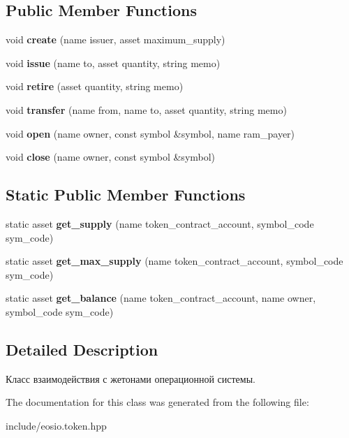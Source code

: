\subsection*{Public Member Functions}
\begin{DoxyCompactItemize}
\item 
\mbox{\label{classeosio_1_1token_a398d3ab0784aa52d314ff47666c51701}} 
void {\bfseries create} (name issuer, asset maximum\+\_\+supply)
\item 
\mbox{\label{classeosio_1_1token_a7dc16dac15ffa8313424676fc02c7015}} 
void {\bfseries issue} (name to, asset quantity, string memo)
\item 
\mbox{\label{classeosio_1_1token_a29c839dfaad1b3c46c2c3ababf232359}} 
void {\bfseries retire} (asset quantity, string memo)
\item 
\mbox{\label{classeosio_1_1token_a47e89b1fb0cf66946528bdebd9c786d9}} 
void {\bfseries transfer} (name from, name to, asset quantity, string memo)
\item 
\mbox{\label{classeosio_1_1token_a119743fdb70ea5f9dc1fea2c7774ed2d}} 
void {\bfseries open} (name owner, const symbol \&symbol, name ram\+\_\+payer)
\item 
\mbox{\label{classeosio_1_1token_a35f91e5e77635f0dfadc0eea93ec9da7}} 
void {\bfseries close} (name owner, const symbol \&symbol)
\end{DoxyCompactItemize}
\subsection*{Static Public Member Functions}
\begin{DoxyCompactItemize}
\item 
\mbox{\label{classeosio_1_1token_a1fb6c9a84871da4fb2f6023de5351dcf}} 
static asset {\bfseries get\+\_\+supply} (name token\+\_\+contract\+\_\+account, symbol\+\_\+code sym\+\_\+code)
\item 
\mbox{\label{classeosio_1_1token_a10fdccf5b89beaea3ba8fa5e300675bc}} 
static asset {\bfseries get\+\_\+max\+\_\+supply} (name token\+\_\+contract\+\_\+account, symbol\+\_\+code sym\+\_\+code)
\item 
\mbox{\label{classeosio_1_1token_a3d5912b5b8a3a76d91b9fae94695e58f}} 
static asset {\bfseries get\+\_\+balance} (name token\+\_\+contract\+\_\+account, name owner, symbol\+\_\+code sym\+\_\+code)
\end{DoxyCompactItemize}


\subsection{Detailed Description}
Класс взаимодействия с жетонами операционной системы. 

The documentation for this class was generated from the following file\+:\begin{DoxyCompactItemize}
\item 
include/eosio.\+token.\+hpp\end{DoxyCompactItemize}
